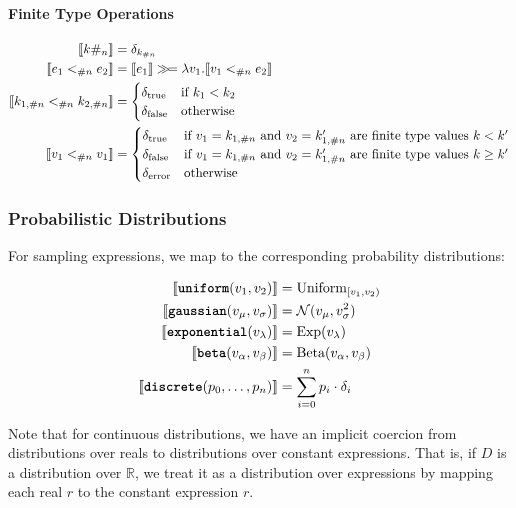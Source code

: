 \paragraph{Finite Type Operations}
\begin{align*}
\sem{ \finconst{k}{n} } &= \delta_{k_{\#n}} \\
%
\sem{ e_1 \finlt{n} e_2 } &= \sem{ e_1 } \gg\!= \lambda v_1. \sem{ v_1 \finlt{n} e_2 } \\
%
\sem{ k_{1,\#n} \finlt{n} k_{2,\#n} } &= \begin{cases}
    \delta_{\text{true}} & \text{if } k_1 < k_2 \\
    \delta_{\text{false}} & \text{otherwise}
\end{cases} \\
%
\sem{ v_1 \finlt{n} v_1 } &= \begin{cases}
	\delta_{\text{true}} & \text{if $v_1 = k_{1,\#n}$ and $v_2=k_{1,\#n}'$ are finite type values}~k < k' \\
	\delta_{\text{false}} & \text{if $v_1 = k_{1,\#n}$ and $v_2=k_{1,\#n}'$ are finite type values}~k \geq k' \\
	\delta_{\error} & \text{otherwise}
\end{cases}
\end{align*}

\subsubsection{Probabilistic Distributions}

For sampling expressions, we map to the corresponding probability distributions:

\begin{align*}
\llbracket  \text{\ttfamily\bfseries uniform}(v_1, v_2)  \rrbracket &= \text{Uniform}_{[v_1, v_2)} \\
\llbracket  \text{\ttfamily\bfseries gaussian}(v_\mu, v_\sigma)  \rrbracket &= \mathcal{N}(v_\mu, v_\sigma^2) \\
\llbracket  \text{\ttfamily\bfseries exponential}(v_\lambda)  \rrbracket &= \text{Exp}(v_\lambda) \\
\llbracket  \text{\ttfamily\bfseries beta}(v_\alpha, v_\beta)  \rrbracket &= \text{Beta}(v_\alpha, v_\beta) \\
\llbracket  \text{\ttfamily\bfseries discrete}(p_0, \ldots, p_n)  \rrbracket &= \sum_{i=0}^n p_i \cdot \delta_i
\end{align*}

Note that for continuous distributions, we have an implicit coercion from distributions over reals to distributions over constant expressions. That is, if $D$ is a distribution over $\mathbb{R}$, we treat it as a distribution over expressions by mapping each real $r$ to the constant expression $r$.


